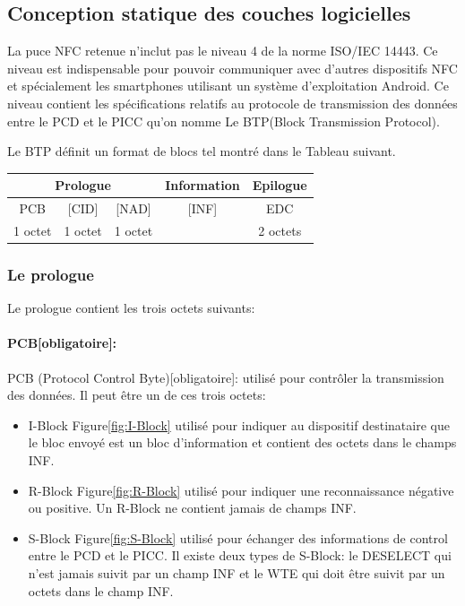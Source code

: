 \documentclass{themeensg}
\begin{document}
\subsection{Conception statique des couches logicielles}
La puce NFC retenue n'inclut pas le niveau 4 de la norme ISO/IEC 14443. Ce niveau est indispensable pour pouvoir communiquer avec d'autres dispositifs NFC et spécialement les smartphones utilisant un système d'exploitation Android. Ce niveau contient les spécifications relatifs au protocole de transmission des données entre le PCD et le PICC qu'on nomme Le BTP(Block Transmission Protocol).

Le BTP définit un format de blocs tel montré dans le Tableau suivant.

\begin{tabular}[hf]{|c|c|c|c|c|c|c|c|}
\hline
\multicolumn{3}{|c|}{Prologue} & \multicolumn{3}{c|}{Information} & \multicolumn{2}{c|}{Epilogue} \\
\hline
PCB & [CID] & [NAD] & \multicolumn{3}{|c|}{[INF]} & \multicolumn{2}{c|}{EDC}\\
\hline
1 octet & 1 octet & 1 octet & \multicolumn{3}{|c|}{} & \multicolumn{2}{c|}{2 octets}\\
\hline
\end{tabular}

\subsubsection{Le prologue}
Le prologue contient les trois octets suivants:
\paragraph{PCB[obligatoire]:}
PCB (Protocol Control Byte)[obligatoire]: utilisé pour contrôler la transmission des données. Il peut être un de ces trois octets:
\begin{itemize}
\item I-Block Figure\ref{fig:I-Block} utilisé pour indiquer au dispositif destinataire que le bloc envoyé est un bloc d'information et contient des octets dans le champs INF.
\item R-Block Figure\ref{fig:R-Block} utilisé pour indiquer une reconnaissance négative ou positive. Un R-Block ne contient jamais de champs INF.
\item S-Block Figure\ref{fig:S-Block} utilisé pour échanger des informations de control entre le PCD et le PICC. Il existe deux types de S-Block: le DESELECT qui n'est jamais suivit par un champ INF et le WTE qui doit être suivit par un octets dans le champ INF.
\end{itemize}
\end{document}
